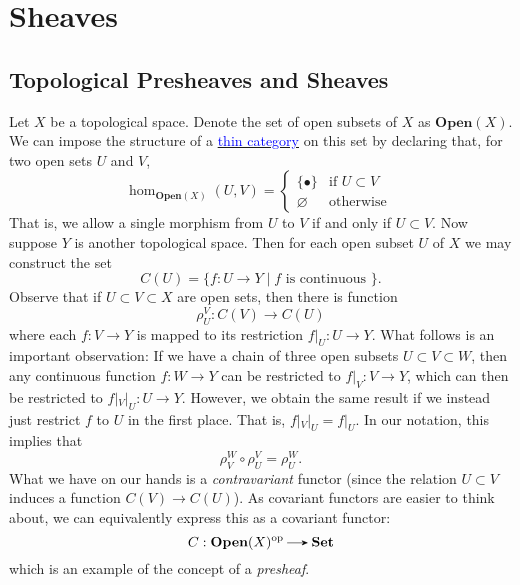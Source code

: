 \chapter{Sheaves}
\section{Topological Presheaves and Sheaves}

Let $X$ be a topological space. Denote the set of open subsets of $X$
as $\textbf{Open}(X)$. We can impose the structure of a
\hyperref[definition:thin-category]{\textcolor{Blue}{thin category}}
on this set by declaring that, for two open sets $U$ and $V$, 
\[
    \hom_{\textbf{Open}(X)}(U, V) = 
    \begin{cases}
        \{\bullet\} & \text{if } U \subset V\\
        \varnothing & \text{otherwise }
    \end{cases}
\]
That is, we allow a single morphism from $U$ to $V$ if and only if 
$U \subset V$. 
Now suppose $Y$ is another topological space. Then for each open subset 
$U$ of $X$ we may construct the set 
\[
    C(U) = \{ f: U \to Y \mid f \text{ is continuous } \}.    
\]
Observe that if $U \subset V \subset X$ are open sets, then 
there is function 
\[
    \rho_U^V: C(V) \to C(U)
\]
where each $f: V \to Y$ is mapped to its restriction $f|_U: U \to Y$.
What follows is an important observation: If we have a chain of three open subsets $U \subset V \subset W$, 
then any continuous function $f: W \to Y$ can be restricted to $f|_V: V \to Y$, 
which can then be restricted to $f|_V|_U: U \to Y$. However, we obtain the same 
result if we instead just restrict $f$ to $U$ in the first place. That is, 
$f|_V|_U = f|_U$. In our notation, this implies that 
\[
    \rho_V^W \circ \rho_U^V = \rho_U^W. 
\]
What we have on our hands is a \emph{contravariant} functor (since the relation 
$U \subset V$ induces a function $C(V) \to C(U)$). As covariant functors 
are easier to think about, we can equivalently express this as a covariant functor:
\[
    C: \textbf{Open}(X)\op \to \textbf{Set}
\]
which is an example of the concept of a \emph{presheaf}. 

